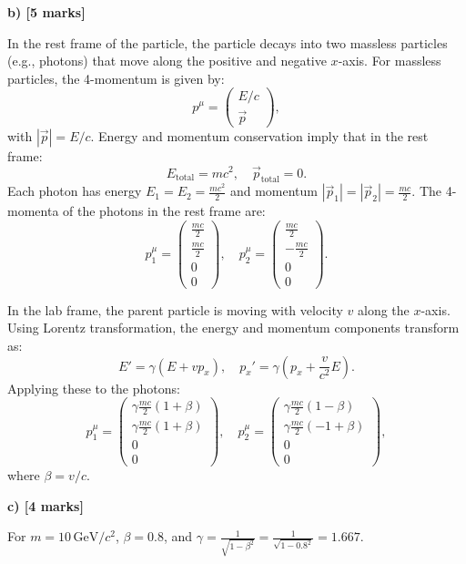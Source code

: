 \textbf{b) [5 marks]}

In the rest frame of the particle, the particle decays into two massless particles (e.g., photons) that move along the positive and negative \(x\)-axis. For massless particles, the 4-momentum is given by:
\[
p^\mu = \begin{pmatrix} E/c \\ \vec{p} \end{pmatrix},
\]
with \(|\vec{p}| = E/c\). Energy and momentum conservation imply that in the rest frame:
\[
E_{\text{total}} = mc^2, \quad \vec{p}_{\text{total}} = 0.
\]
Each photon has energy \(E_1 = E_2 = \frac{mc^2}{2}\) and momentum \(|\vec{p}_1| = |\vec{p}_2| = \frac{mc}{2}\). The 4-momenta of the photons in the rest frame are:
\[
p_1^\mu = \begin{pmatrix} \frac{mc}{2} \\ \frac{mc}{2} \\ 0 \\ 0 \end{pmatrix}, \quad 
p_2^\mu = \begin{pmatrix} \frac{mc}{2} \\ -\frac{mc}{2} \\ 0 \\ 0 \end{pmatrix}.
\]

In the lab frame, the parent particle is moving with velocity \(v\) along the \(x\)-axis. Using Lorentz transformation, the energy and momentum components transform as:
\[
E' = \gamma (E + vp_x), \quad p_x' = \gamma (p_x + \frac{v}{c^2}E).
\]
Applying these to the photons:
\[
p_1^\mu = \begin{pmatrix} \gamma \frac{mc}{2}(1 + \beta) \\ \gamma \frac{mc}{2}(1 + \beta) \\ 0 \\ 0 \end{pmatrix}, \quad 
p_2^\mu = \begin{pmatrix} \gamma \frac{mc}{2}(1 - \beta) \\ \gamma \frac{mc}{2}(-1 + \beta) \\ 0 \\ 0 \end{pmatrix},
\]
where \(\beta = v/c\).

\textbf{c) [4 marks]}

For \(m = 10 \, \text{GeV}/c^2\), \(\beta = 0.8\), and \(\gamma = \frac{1}{\sqrt{1 - \beta^2}} = \frac{1}{\sqrt{1 - 0.8^2}} = 1.667\).

